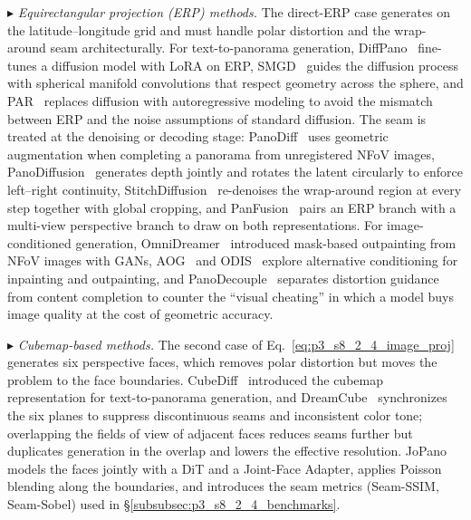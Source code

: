$\blacktriangleright$ \textit{Equirectangular projection (ERP) methods.} The direct-ERP case generates on the latitude--longitude grid and must handle polar distortion and the wrap-around seam architecturally.
For text-to-panorama generation, DiffPano~\cite{ye2024diffpano} fine-tunes a diffusion model with LoRA on ERP, SMGD~\cite{sun2025spherical} guides the diffusion process with spherical manifold convolutions that respect geometry across the sphere, and PAR~\cite{wang2025conditional} replaces diffusion with autoregressive modeling to avoid the mismatch between ERP and the noise assumptions of standard diffusion.
The seam is treated at the denoising or decoding stage: PanoDiff~\cite{panodiff} uses geometric augmentation when completing a panorama from unregistered NFoV images, PanoDiffusion~\cite{wupanodiffusion} generates depth jointly and rotates the latent circularly to enforce left--right continuity, StitchDiffusion~\cite{stitchdiffusion} re-denoises the wrap-around region at every step together with global cropping, and PanFusion~\cite{zhang2024taming} pairs an ERP branch with a multi-view perspective branch to draw on both representations.
For image-conditioned generation, OmniDreamer~\cite{omnidreamer2022} introduced mask-based outpainting from NFoV images with GANs, AOG~\cite{aog} and ODIS~\cite{odis} explore alternative conditioning for inpainting and outpainting, and PanoDecouple~\cite{zheng2025panorama} separates distortion guidance from content completion to counter the ``visual cheating'' in which a model buys image quality at the cost of geometric accuracy.

$\blacktriangleright$ \textit{Cubemap-based methods.} The second case of Eq.~\eqref{eq:p3_s8_2_4_image_proj} generates six perspective faces, which removes polar distortion but moves the problem to the face boundaries.
CubeDiff~\cite{kalischek2025cubediff} introduced the cubemap representation for text-to-panorama generation, and DreamCube~\cite{huang2025dreamcube} synchronizes the six planes to suppress discontinuous seams and inconsistent color tone; overlapping the fields of view of adjacent faces reduces seams further but duplicates generation in the overlap and lowers the effective resolution.
JoPano~\cite{feng2025jopano} models the faces jointly with a DiT and a Joint-Face Adapter, applies Poisson blending along the boundaries, and introduces the seam metrics (Seam-SSIM, Seam-Sobel) used in §\ref{subsubsec:p3_s8_2_4_benchmarks}.

